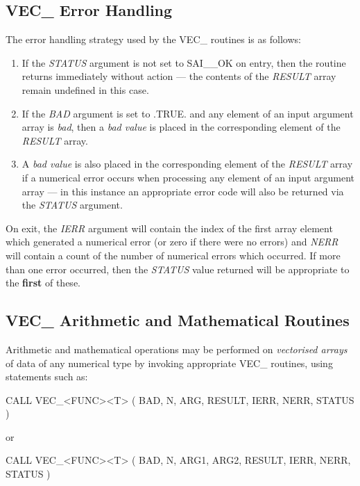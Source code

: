 \documentclass[11pt,nolof]{starlink}
\providecommand{\name}[1]{#1}
\providecommand{\fortvar}[1]{\emph{#1}}
\begin{document}
\subsection{\name{VEC\_} Error Handling}
\label{section:vec:error}

The error handling strategy used by the \name{VEC\_} routines is as follows:

\begin{enumerate}

\item If the \fortvar{STATUS} argument is not set to \name{SAI\_\_OK} on
entry, then the routine returns immediately without action ---
the contents of the \fortvar{RESULT} array remain undefined in this case.

\item If the \fortvar{BAD} argument is set to \name{.TRUE.} and any
element of an input argument array is \emph{bad}, then a \emph{bad value} is
placed in the corresponding element of the \fortvar{RESULT} array.

\item A \emph{bad value} is also placed in the corresponding element of the
\fortvar{RESULT} array if a numerical error occurs when processing any
element of an input argument array --- in this instance an appropriate
error code will also be returned via the \fortvar{STATUS} argument.

\end{enumerate}

On exit, the \fortvar{IERR} argument will contain the index of the first
array element which generated a numerical error (or zero if there were no
errors) and \fortvar{NERR} will contain a count of the number of
numerical errors which occurred.
If more than one error occurred, then the \fortvar{STATUS} value returned will
be appropriate to the \textbf{first} of these.

\subsection{\name{VEC\_} Arithmetic and Mathematical Routines}

Arithmetic and mathematical operations may be performed on \emph{vectorised
arrays} of data of any numerical type by invoking appropriate \name{VEC\_}
routines, using statements such as:

\begin{terminalv}
CALL VEC_<FUNC><T> ( BAD, N, ARG, RESULT, IERR, NERR, STATUS )
\end{terminalv}
or
\begin{terminalv}
CALL VEC_<FUNC><T> ( BAD, N, ARG1, ARG2, RESULT, IERR, NERR, STATUS )
\end{terminalv}
\end{document}
